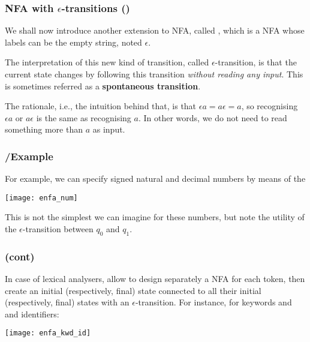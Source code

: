 
% 
\begin{frame}
\frametitle{NFA with \(\epsilon\)-transitions (\eNFA)}

We shall now introduce another extension to NFA, called \eNFA, which
is a NFA whose labels can be the empty string, noted \(\epsilon\). 

\bigskip

The interpretation of this new kind of transition, called
\(\epsilon\)-transition, is that the current state changes by
following this transition \emph{without reading any input}. This is
sometimes referred as a \textbf{spontaneous transition}.

\bigskip

The rationale, i.e., the intuition behind that, is that \(\epsilon a =
a \epsilon = a\), so recognising \(\epsilon a\) or \(a\epsilon\) is
the same as recognising \(a\). In other words, we do not need to read
something more than \(a\) as input.

\end{frame}

% 
\begin{frame}
\frametitle{\eNFA{}/Example}

\label{enfa_num}

For example, we can specify signed natural and decimal numbers by
means of the \eNFA
\begin{center}
\texttt{[image: enfa\_num]}
\end{center}
This is not the simplest \eNFA we can imagine for these numbers, but
note the utility of the \(\epsilon\)-transition between \(q_0\) and
\(q_1\).

\end{frame}

% 
\begin{frame}
\frametitle{\eNFA (cont)}

In case of lexical analysers, \eNFA allow to design separately a NFA
for each token, then create an initial (respectively, final) state
connected to all their initial (respectively, final) states with an
\(\epsilon\)-transition. For instance, for keywords  and
 and identifiers:
\begin{center}
\texttt{[image: enfa\_kwd\_id]}
\end{center}

\end{frame}

